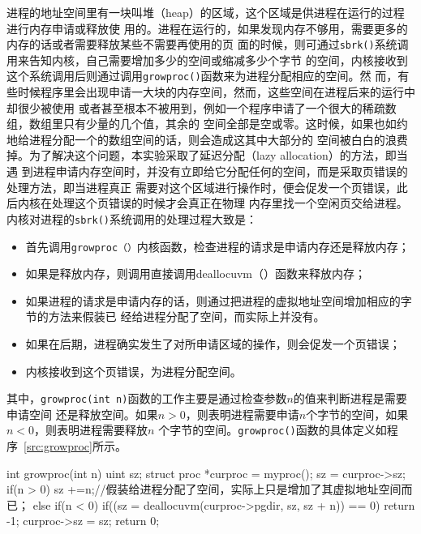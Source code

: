 \documentclass{swfcthesismscctex}
\begin{document}
进程的地址空间里有一块叫堆（heap）的区域，这个区域是供进程在运行的过程进行内存申请或释放使
用的。进程在运行的，如果发现内存不够用，需要更多的内存的话或者需要释放某些不需要再使用的页
面的时候，则可通过\texttt{sbrk()}系统调用来告知内核，自己需要增加多少的空间或缩减多少个字节
的空间，内核接收到这个系统调用后则通过调用\texttt{growproc()}函数来为进程分配相应的空间。然
而，有些时候程序里会出现申请一大块的内存空间，然而，这些空间在进程后来的运行中却很少被使用
或者甚至根本不被用到，例如一个程序申请了一个很大的稀疏数组，数组里只有少量的几个值，其余的
空间全部是空或零。这时候，如果也如约地给进程分配一个的数组空间的话，则会造成这其中大部分的
空间被白白的浪费掉。为了解决这个问题，本实验采取了延迟分配（lazy allocation）的方法，即当遇
到进程申请内存空间时，并没有立即给它分配任何的空间，而是采取页错误的处理方法，即当进程真正
需要对这个区域进行操作时，便会促发一个页错误，此后内核在处理这个页错误的时候才会真正在物理
内存里找一个空闲页交给进程。内核对进程的\texttt{sbrk()}系统调用的处理过程大致是：
\begin{itemize}
\item 首先调用\texttt{growproc（）}内核函数，检查进程的请求是申请内存还是释放内存；
\item 如果是释放内存，则调用直接调用deallocuvm（）函数来释放内存；
\item 如果进程的请求是申请内存的话，则通过把进程的虚拟地址空间增加相应的字节的方法来假装已
  经给进程分配了空间，而实际上并没有。
\item 如果在后期，进程确实发生了对所申请区域的操作，则会促发一个页错误；
\item 内核接收到这个页错误，为进程分配空间。
\end{itemize}
其中，\texttt{growproc(int n)}函数的工作主要是通过检查参数$n$的值来判断进程是需要申请空间
还是释放空间。如果$n>0$，则表明进程需要申请$n$个字节的空间，如果$n<0$，则表明进程需要释放$n$
个字节的空间。\texttt{growproc()}函数的具体定义如程序~\ref{src:growproc}所示。

\begin{listing}
  \begin{codeblock}
\begin{ccode}
int growproc(int n)
{
  uint sz;
  struct proc *curproc = myproc();
  sz = curproc->sz;
  if(n > 0){ 
    sz +=n;//假装给进程分配了空间，实际上只是增加了其虚拟地址空间而已；
   } else if(n < 0){
    if((sz = deallocuvm(curproc->pgdir, sz, sz + n)) == 0)
      return -1;
  }
  curproc->sz = sz;
  return 0;
}
\end{ccode}
  \end{codeblock}
  \label{src:growproc}
\end{listing}
\end{document}
